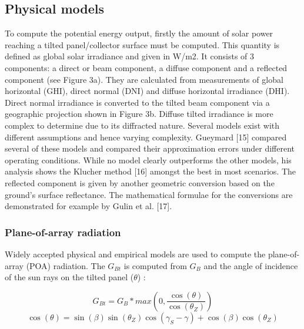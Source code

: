 \subsection{Physical models}
\label{phys_models}

To compute the potential energy output, firstly the amount of solar power reaching a tilted panel/collector surface must be computed. This quantity is defined as global solar irradiance and given in W/m2. It consists of 3 components: a direct or beam component, a diffuse component and a reflected component (see Figure 3a). They are calculated from measurements of global horizontal (GHI), direct normal (DNI) and diffuse horizontal irradiance (DHI). Direct normal irradiance is converted to the tilted beam component via a geographic projection shown in Figure 3b. Diffuse tilted irradiance is more complex to determine due to its diffracted nature. Several models exist with different assumptions and hence varying complexity. Gueymard [15] compared several of these models and compared their approximation errors under different operating conditions. While no model clearly outperforms the other models, his analysis shows the Klucher method [16] amongst the best in most scenarios. The reflected component is given by another geometric conversion based on the ground’s surface reflectance. The mathematical formulae for the conversions are demonstrated for example by Gulin et al. [17].


\subsubsection{Plane-of-array radiation}
\label{app:irrad}

Widely accepted physical and empirical models are used to compute the plane-of-array (POA) radiation.
%
The $G_{Bt}$ is computed from $G_B$ and the angle of incidence of the sun rays on the tilted panel ($\theta$) \cite{gulin_estimation_2013}:

\begin{equation}
\label{eq:direct}
    G_{Bt} = G_{B} * max \left( 0, \frac{\cos(\theta)}{\cos(\theta_Z)} \right)
\end{equation}
\begin{equation}
\label{eq:dir_angle}
\cos(\theta) = \sin(\beta) \sin(\theta_Z) \cos(\gamma_S - \gamma) + \cos(\beta) \cos(\theta_Z) 
\end{equation}

